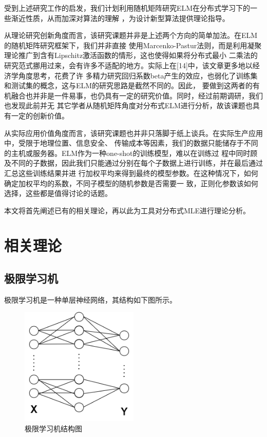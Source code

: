 \documentclass[UTF8,12pt]{ctexart}
\begin{document}
受到上述研究工作的启发，我们计划利用随机矩阵研究ELM在分布式学习下的一些渐近性质，从而加深对算法的理解
，为设计新型算法提供理论指导。

从理论研究创新角度而言，该研究课题并非是上述两个方向的简单加法。在ELM的随机矩阵研究框架下，我们并非直接
使用Marcenko-Pastur法则，而是利用凝聚理论推广到含有Lipschitz激活函数的情形，这也使得如果将分布式最小
二乘法的研究范式挪用过来，会有许多不适配的地方。实际上在[14]中，该文章更多地以经济学角度思考，花费了许
多精力研究回归系数beta产生的效应，也弱化了训练集和测试集的概念，这与ELM的研究思路是截然不同的。因此，
要做到这两者的有机融合也并非是一件易事，也仍具有一定的研究价值。同时，经过前期调研，我们也发现此前并无
其它学者从随机矩阵角度对分布式ELM进行分析，故该课题也具有一定的创新价值。

从实际应用价值角度而言，该研究课题也并非只落脚于纸上谈兵。在实际生产应用中，受限于地理位置、信息安全、
传输成本等因素，我们的数据只能储存于不同的主机或服务器。ELM作为一种one-shot的训练模型，难以在训练过
程中同时顾及不同的子数据，因此我们只能通过分别在每个子数据上进行训练，并在最后通过汇总这些训练结果并进
行加权平均来得到最终的模型参数。在这种情况下，如何确定加权平均的系数，不同子模型的随机参数是否需要一
致，正则化参数该如何选择，这些都是值得讨论的话题。

本文将首先阐述已有的相关理论，再以此为工具对分布式MLE进行理论分析。

\section{相关理论}
\subsection{极限学习机}

极限学习机是一种单层神经网络，其结构如下图所示。
\begin{figure}[htbp]
    \centering
    \includegraphics[width=0.5\textwidth]{ELM.png}
    \caption{极限学习机结构图}
\end{figure}
\end{document}
